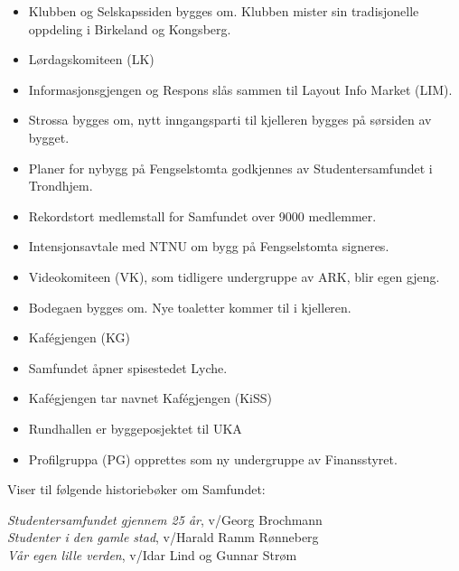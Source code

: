 
\begin{itemize}
  \item Klubben og Selskapssiden bygges om. Klubben mister sin tradisjonelle oppdeling i Birkeland og Kongsberg.
\end{itemize}


\begin{itemize}
  \item Lørdagskomiteen (LK)
\end{itemize}


\begin{itemize}
  \item Informasjonsgjengen og Respons slås sammen til Layout Info Market (LIM).
  \item Strossa bygges om, nytt inngangsparti til kjelleren bygges på sørsiden av bygget.
\end{itemize}


\begin{itemize}
  \item Planer for nybygg på Fengselstomta godkjennes av Studentersamfundet i Trondhjem.
\end{itemize}


\begin{itemize}
  \item Rekordstort medlemstall for Samfundet over 9000 medlemmer.
  \item Intensjonsavtale med NTNU om bygg på Fengselstomta signeres.
  \item Videokomiteen (VK), som tidligere undergruppe av ARK, blir egen gjeng.
  \item Bodegaen bygges om. Nye toaletter kommer til i kjelleren.
  \item Kafégjengen (KG)
\end{itemize}


\begin{itemize}
  \item Samfundet åpner spisestedet Lyche.
  \item Kafégjengen tar navnet Kafégjengen (KiSS)
\end{itemize}


\begin{itemize}
  \item Rundhallen er byggeposjektet til UKA
  \item Profilgruppa (PG) opprettes som ny undergruppe av Finansstyret.
\end{itemize}

Viser til følgende historiebøker om Samfundet:

\textit{Studentersamfundet gjennem 25 år}, v/Georg Brochmann\\
\textit{Studenter i den gamle stad}, v/Harald Ramm Rønneberg\\
\textit{Vår egen lille verden}, v/Idar Lind og Gunnar Strøm\\
